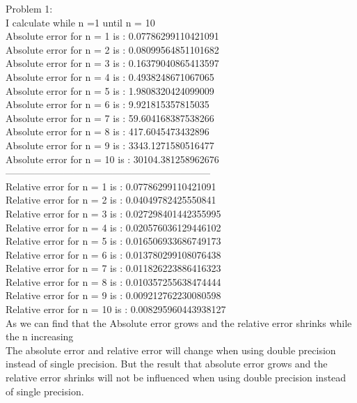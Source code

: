 \documentclass{article}
\begin{document}
Problem 1:\\
I calculate while n =1 until n = 10\\
Absolute error for n = 1 is : 0.07786299110421091\\
Absolute error for n = 2 is : 0.08099564851101682\\
Absolute error for n = 3 is : 0.16379040865413597\\
Absolute error for n = 4 is : 0.4938248671067065\\
Absolute error for n = 5 is : 1.9808320424099009\\
Absolute error for n = 6 is : 9.921815357815035\\
Absolute error for n = 7 is : 59.604168387538266\\
Absolute error for n = 8 is : 417.6045473432896\\
Absolute error for n = 9 is : 3343.1271580516477\\
Absolute error for n = 10 is : 30104.381258962676\\
---------------------------------------------------------------\\
Relative error for n = 1 is : 0.07786299110421091\\
Relative error for n = 2 is : 0.04049782425550841\\
Relative error for n = 3 is : 0.027298401442355995\\
Relative error for n = 4 is : 0.020576036129446102\\
Relative error for n = 5 is : 0.016506933686749173\\
Relative error for n = 6 is : 0.013780299108076438\\
Relative error for n = 7 is : 0.011826223886416323\\
Relative error for n = 8 is : 0.010357255638474444\\
Relative error for n = 9 is : 0.009212762230080598\\
Relative error for n = 10 is : 0.008295960443938127\\
As we can find that the Absolute error grows and the relative error shrinks while the n increasing\\
The absolute error and relative error will change when using double precision instead of single precision. 
But the result that absolute error grows and the relative error shrinks will not be influenced when using double precision instead of single precision.\\
\end{document}
